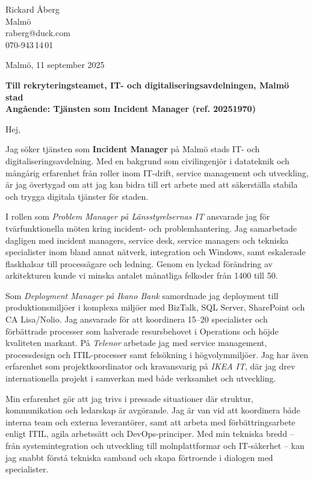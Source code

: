 \documentclass[11pt,a4paper]{article}
\begin{document}
\begin{flushright}
Rickard Åberg \\
Malmö \\
raberg@duck.com \\
070-943\,14\,01 \\
\end{flushright}

\vspace{1em}

\noindent Malmö, 11 september 2025

\vspace{1em}

\noindent \textbf{Till rekryteringsteamet, IT- och digitaliseringsavdelningen, Malmö stad} \\
\textbf{Angående: Tjänsten som Incident Manager (ref. 20251970)}

\vspace{1em}

Hej,

Jag söker tjänsten som \textbf{Incident Manager} på Malmö stads IT- och digitaliseringsavdelning. Med en bakgrund som civilingenjör i datateknik och mångårig erfarenhet från roller inom IT-drift, service management och utveckling, är jag övertygad om att jag kan bidra till ert arbete med att säkerställa stabila och trygga digitala tjänster för staden.

I rollen som \textit{Problem Manager på Länsstyrelsernas IT} ansvarade jag för tvärfunktionella möten kring incident- och problemhantering. Jag samarbetade dagligen med incident managers, service desk, service managers och tekniska specialister inom bland annat nätverk, integration och Windows, samt eskalerade flaskhalsar till processägare och ledning. Genom en lyckad förändring av arkitekturen kunde vi minska antalet månatliga felkoder från 1400 till 50.

Som \textit{Deployment Manager på Ikano Bank} samordnade jag deployment till produktionsmiljöer i komplexa miljöer med BizTalk, SQL Server, SharePoint och CA Lisa/Nolio. Jag ansvarade för att koordinera 15–20 specialister och förbättrade processer som halverade resursbehovet i Operations och höjde kvaliteten markant. På \textit{Telenor} arbetade jag med service management, processdesign och ITIL-processer samt felsökning i högvolymmiljöer. Jag har även erfarenhet som projektkoordinator och kravansvarig på \textit{IKEA IT}, där jag drev internationella projekt i samverkan med både verksamhet och utveckling.

Min erfarenhet gör att jag trivs i pressade situationer där struktur, kommunikation och ledarskap är avgörande. Jag är van vid att koordinera både interna team och externa leverantörer, samt att arbeta med förbättringsarbete enligt ITIL, agila arbetssätt och DevOps-principer. Med min tekniska bredd – från systemintegration och utveckling till molnplattformar och IT-säkerhet – kan jag snabbt förstå tekniska samband och skapa förtroende i dialogen med specialister.
\end{document}
